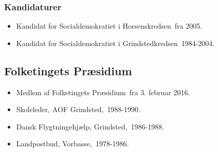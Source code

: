 \documentclass[11pt, a4paper]{awesome-cv}
\begin{document}
\begin{cvletter}
\subsubsection*{Kandidaturer}
\begin{itemize}
\item Kandidat for Socialdemokratiet i Horsenskredsen fra 2005.
\item Kandidat for Socialdemokratiet i Grindstedkredsen 1984-2004.
\end{itemize}
\subsection*{Folketingets Præsidium}
\begin{itemize}
\item Medlem af Folketingets Præsidium fra 3. februar 2016.
\end{itemize}
\begin{itemize}
\item Skoleleder, AOF Grindsted, 1988-1990.
\item Dansk Flygtningehjælp, Grindsted, 1986-1988.
\item Landpostbud, Vorbasse, 1978-1986.
\end{itemize}
\end{cvletter}
\end{document}
